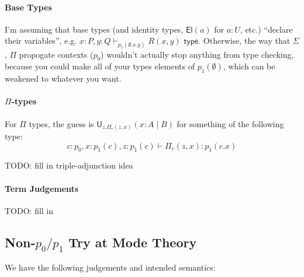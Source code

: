 \documentclass[10pt]{article}
\newcommand{\yields}{\vdash}
\newcommand{\type}{\,\,\mathsf{type}}
\newcommand\U[3]{\ensuremath{\mathsf{U}_{#1}(#2 \mid #3)}}
\begin{document}
\paragraph{Base Types}

I'm assuming that base types (and identity types, $\mathsf{El}(a)$ for
$a : U$, etc.) ``declare their variables'', e.g. $x : P, y : Q
\vdash_{p_1(\emptyset.x.y)} R(x,y) \type$.  Otherwise, the way that
$\Sigma$, $\Pi$ propogate contexts ($p_0$) wouldn't actually stop
anything from type checking, because you could make all of your types
elements of $p_1(\emptyset)$, which can be weakened to whatever you
want.

\paragraph{$\Pi$-types}

For $\Pi$ types, the guess is $\U{z.\Pi_c(z,x)}{x : A}{B}$ for something
of the following type:
\[ 
c : p_0, x : p_1(c), z : p_1(c) \yields \Pi_c(z,x) : p_1(c.x) 
\]

TODO: fill in triple-adjunction idea

\paragraph{Term Judgements}  

TODO: fill in

\subsection*{Non-$p_0/p_1$ Try at Mode Theory}

We have the following judgements and intended semantics:
\end{document}
